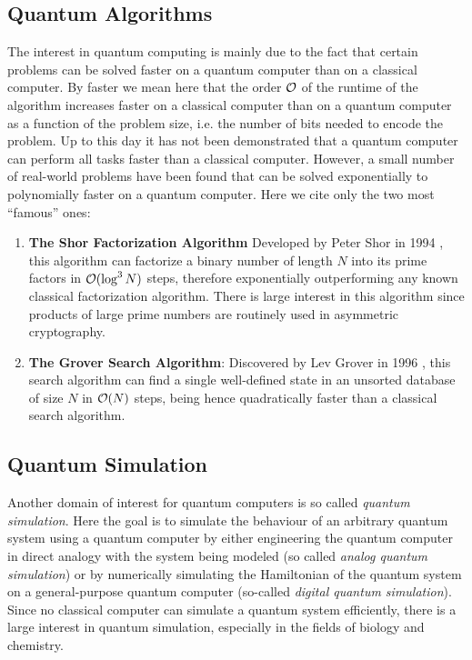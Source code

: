 \subsection{Quantum Algorithms}

The interest in quantum computing is mainly due to the fact that certain problems can be solved faster on a quantum computer than on a classical computer. By faster we mean here that the order $\cal{O}$ of the runtime of the algorithm increases faster on a classical computer than on a quantum computer as a function of the problem size, i.e. the number of bits needed to encode the problem. Up to this day it has not been demonstrated that a quantum computer can perform all tasks faster than a classical computer. However, a small number of real-world problems have been found that can be solved exponentially to polynomially faster on a quantum computer. Here we cite only the two most ``famous'' ones:

\begin{enumerate}
\item \textbf{The Shor Factorization Algorithm} Developed by Peter Shor in 1994 \citep{shor_algorithms_1994,shor_polynomial-time_1995}, this algorithm can factorize a binary number of length $N$ into its prime factors in $\begin{mathcal}O\end{mathcal}(\log^3{N})$ steps, therefore exponentially outperforming any known classical factorization algorithm. There is large interest in this algorithm since products of large prime numbers are routinely used in asymmetric cryptography.
\item \textbf{The Grover Search Algorithm}: Discovered by Lev Grover in 1996 \citep{grover_fast_1996}, this search algorithm can find a single well-defined state in an unsorted database of size $N$ in $\begin{mathcal}O\end{mathcal}(N)$ steps, being hence quadratically faster than a classical search algorithm.
\end{enumerate}

\subsection{Quantum Simulation}

Another domain of interest for quantum computers is so called {\it quantum simulation}. Here the goal is to simulate the behaviour of an arbitrary quantum system using a quantum computer by either engineering the quantum computer in direct analogy with the system being modeled (so called {\it analog quantum simulation}) or by numerically simulating the Hamiltonian of the quantum system on a general-purpose quantum computer (so-called {\it digital quantum simulation}). Since no classical computer can simulate a quantum system efficiently, there is a large interest in quantum simulation, especially in the fields of biology and chemistry.

